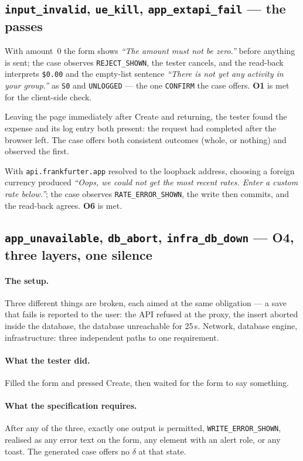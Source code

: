 \documentclass[11pt,a4paper]{article}
\newcommand{\gate}[1]{\texttt{\small #1}}
\newcommand{\obl}[1]{\textbf{O#1}}
\begin{document}
\subsection{\gate{input\_invalid}, \gate{ue\_kill}, \gate{app\_extapi\_fail} --- the passes}

With amount~0 the form shows \emph{``The amount must not be zero.''} before
anything is sent; the case observes \gate{REJECT\_SHOWN}, the tester cancels,
and the read-back interprets \texttt{\$0.00} and the empty-list sentence
\emph{``There is not yet any activity in your group.''} as \gate{S0} and
\gate{UNLOGGED} --- the one \gate{CONFIRM} the case offers. \obl{1} is met for
the client-side check.

Leaving the page immediately after Create and returning, the tester found the
expense and its log entry both present: the request had completed after the
browser left. The case offers both consistent outcomes (whole, or nothing) and
observed the first.

With \texttt{api.frankfurter.app} resolved to the loopback address, choosing a
foreign currency produced \emph{``Oops, we could not get the most recent rates.
Enter a custom rate below.''}; the case observes \gate{RATE\_ERROR\_SHOWN}, the
write then commits, and the read-back agrees. \obl{6} is met.

\subsection{\gate{app\_unavailable}, \gate{db\_abort}, \gate{infra\_db\_down} --- \obl{4}, three layers, one silence}
\label{sec:silent}

\paragraph{The setup.}
Three different things are broken, each aimed at the same obligation --- a save
that fails is reported to the user: the API refused at the proxy, the insert
aborted inside the database, the database unreachable for 25\,s. Network,
database engine, infrastructure: three independent paths to one requirement.

\paragraph{What the tester did.}
Filled the form and pressed Create, then waited for the form to say something.

\paragraph{What the specification requires.}
After any of the three, exactly one output is permitted, \gate{WRITE\_ERROR\_SHOWN},
realised as any error text on the form, any element with an alert role, or any
toast. The generated case offers no $\delta$ at that state.
\end{document}
